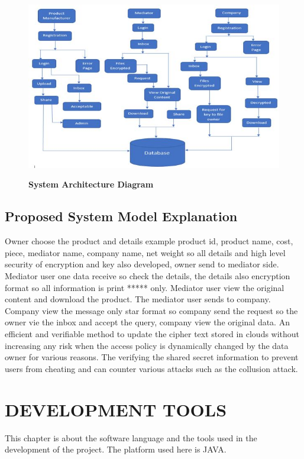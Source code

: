 \documentclass[BTech]{srmuthesis}
\begin{document}
\begin{figure}[H]
\centering
\includegraphics[scale=0.9]{system.jpg}
\label{fig:1}\hspace{10mm}
\caption{\textbf{System Architecture Diagram}}
\end{figure}
\section{Proposed System Model Explanation}
Owner choose the product and details example product id, product name, cost, piece, mediator name, company name, net weight so all details and high level security of encryption and key also developed,  owner  send to mediator side. Mediator user one data receive so check the details, the details also encryption format so all information is print ***** only. Mediator user view the original content and download the product. The mediator user sends to company. Company view the message only star format so company send the request so the owner vie the inbox and accept the query, company view the original data. An efficient and verifiable method to update the cipher text stored in clouds without increasing any risk when the access policy is dynamically changed by the data owner for various reasons. The verifying the shared secret information to prevent users from cheating and can counter various attacks such as the collusion attack.\\

\chapter{DEVELOPMENT TOOLS}
This chapter is about the software language and the tools used in the development of the project. The platform used here is JAVA.\\
\end{document}
